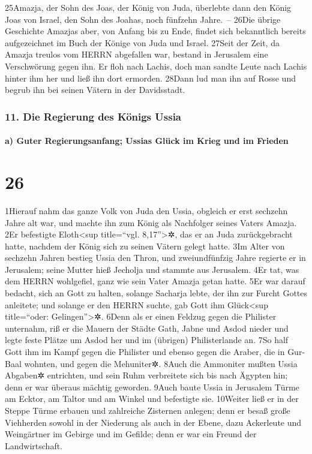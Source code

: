 25Amazja, der Sohn des Joas, der König von Juda, überlebte dann den
König Joas von Israel, den Sohn des Joahas, noch fünfzehn Jahre.~--
26Die übrige Geschichte Amazjas aber, von Anfang bis zu Ende, findet
sich bekanntlich bereits aufgezeichnet im Buch der Könige von Juda und
Israel. 27Seit der Zeit, da Amazja treulos vom HERRN abgefallen war,
bestand in Jerusalem eine Verschwörung gegen ihn. Er floh nach Lachis,
doch man sandte Leute nach Lachis hinter ihm her und ließ ihn dort
ermorden. 28Dann lud man ihn auf Rosse und begrub ihn bei seinen Vätern
in der Davidsstadt.

\hypertarget{die-regierung-des-kuxf6nigs-ussia}{%
\subsubsection{11. Die Regierung des Königs
Ussia}\label{die-regierung-des-kuxf6nigs-ussia}}

\hypertarget{a-guter-regierungsanfang-ussias-gluxfcck-im-krieg-und-im-frieden}{%
\paragraph{a) Guter Regierungsanfang; Ussias Glück im Krieg und im
Frieden}\label{a-guter-regierungsanfang-ussias-gluxfcck-im-krieg-und-im-frieden}}

\hypertarget{section-25}{%
\section{26}\label{section-25}}

1Hierauf nahm das ganze Volk von Juda den Ussia, obgleich er erst
sechzehn Jahre alt war, und machte ihn zum König als Nachfolger seines
Vaters Amazja. 2Er befestigte Eloth\textless sup title=``vgl.
8,17''\textgreater✲, das er an Juda zurückgebracht hatte, nachdem der
König sich zu seinen Vätern gelegt hatte. 3Im Alter von sechzehn Jahren
bestieg Ussia den Thron, und zweiundfünfzig Jahre regierte er in
Jerusalem; seine Mutter hieß Jecholja und stammte aus Jerusalem. 4Er
tat, was dem HERRN wohlgefiel, ganz wie sein Vater Amazja getan hatte.
5Er war darauf bedacht, sich an Gott zu halten, solange Sacharja lebte,
der ihn zur Furcht Gottes anleitete; und solange er den HERRN suchte,
gab Gott ihm Glück\textless sup title=``oder: Gelingen''\textgreater✲.
6Denn als er einen Feldzug gegen die Philister unternahm, riß er die
Mauern der Städte Gath, Jabne und Asdod nieder und legte feste Plätze um
Asdod her und im (übrigen) Philisterlande an. 7So half Gott ihm im Kampf
gegen die Philister und ebenso gegen die Araber, die in Gur-Baal
wohnten, und gegen die Mehuniter✲. 8Auch die Ammoniter mußten Ussia
Abgaben✲ entrichten, und sein Ruhm verbreitete sich bis nach Ägypten
hin; denn er war überaus mächtig geworden. 9Auch baute Ussia in
Jerusalem Türme am Ecktor, am Taltor und am Winkel und befestigte sie.
10Weiter ließ er in der Steppe Türme erbauen und zahlreiche Zisternen
anlegen; denn er besaß große Viehherden sowohl in der Niederung als auch
in der Ebene, dazu Ackerleute und Weingärtner im Gebirge und im Gefilde;
denn er war ein Freund der Landwirtschaft.

